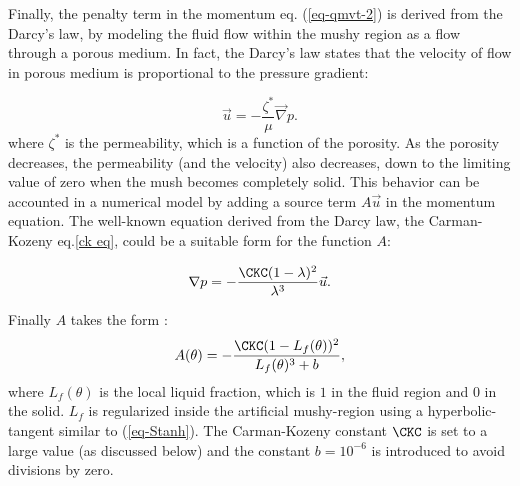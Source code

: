 Finally, the penalty term in the momentum eq. (\ref{eq-qmvt-2}) is derived from the Darcy's law, by modeling the fluid flow within the mushy region as a flow through a porous medium.
In fact, the Darcy's law states that the velocity of flow in porous medium is proportional to the pressure gradient:

\begin{equation}
	\vec u = - \frac{\zeta^*}{\mu} \vec \nabla p.
\end{equation}
where $\zeta^*$ is the permeability, which is a function of the porosity.
As the porosity decreases, the permeability (and the velocity) also decreases, down to the limiting value of zero when the mush becomes completely solid.
This behavior can be accounted in a numerical model by adding a source term $A \vec u$ in the momentum equation.
The well-known equation derived from the Darcy law, the Carman-Kozeny eq.\ref{ck eq}, could be a suitable form for the function $A$:

\begin{equation} \label{ck eq}
	\nabla p = - \frac{\CKC (1 - \lambda)^2}{\lambda^3} \vec u.
\end{equation}

\noindent Finally $A$ takes the form \citep{Belhamadia2012,kheirabadi2015effect}:
\begin{equation}\label{eq-CK}
A(\theta) = -\frac{\CKC (1 - L_f(\theta))^2}{L_f(\theta)^3 + b}, 
\end{equation}
where $L_f(\theta)$ is the local liquid fraction, which is  $1$ in the fluid region and  $0$ in the solid. $L_f$ is regularized inside the artificial  mushy-region using a hyperbolic-tangent similar to (\ref{eq-Stanh}).
The Carman-Kozeny constant $\CKC$ is set to a  large value (as discussed below) and  the constant $b=10^{-6}$ is introduced to avoid divisions by zero.
%

